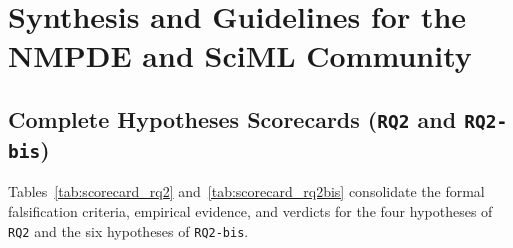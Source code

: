 \section{Synthesis and Guidelines for the NMPDE and SciML Community}
\label{sec:discussion}

\subsection{Complete Hypotheses Scorecards (\texttt{RQ2} and \texttt{RQ2-bis})}

Tables~\ref{tab:scorecard_rq2} and~\ref{tab:scorecard_rq2bis} consolidate the formal falsification criteria, empirical evidence, and verdicts for the four hypotheses of \texttt{RQ2} and the six hypotheses of \texttt{RQ2-bis}.

\begin{table}[!htbp]
\centering
\caption{Scorecard of the four hypotheses of Part~I (\texttt{RQ2}: reconstructor nonlinearity ablation across 816 runs).}
\label{tab:scorecard_rq2}
\footnotesize\resizebox{\textwidth}{!}{%

}
\end{table}
